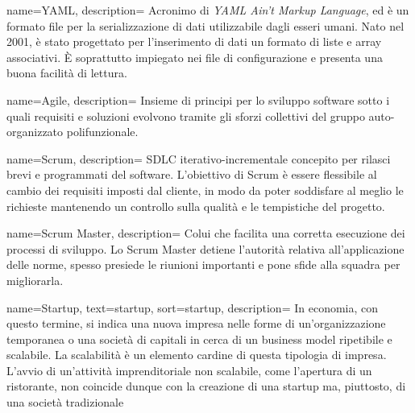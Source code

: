  {
  name=YAML,
  description={
Acronimo di \textit{YAML Ain't Markup Language}, ed è un formato file
per la serializzazione di dati utilizzabile dagli esseri umani. Nato nel 2001,
è stato progettato per l'inserimento di dati un formato di liste e array
associativi. È soprattutto impiegato nei file di configurazione e
presenta una buona facilità di lettura.
}
}

 {
  name=Agile,
  description={
Insieme di principi per lo sviluppo software sotto i quali requisiti e
soluzioni evolvono tramite gli sforzi collettivi del gruppo auto-organizzato
polifunzionale.
}
}

 {
  name=Scrum,
  description={
SDLC iterativo-incrementale concepito per rilasci brevi e programmati del
software. L'obiettivo di Scrum è essere flessibile al cambio dei requisiti
imposti dal cliente, in modo da poter soddisfare al meglio le richieste
mantenendo un controllo sulla qualità e le tempistiche del progetto.
}
}

 {
  name=Scrum Master,
  description={
Colui che facilita una corretta esecuzione dei processi di sviluppo. Lo Scrum
Master detiene l'autorità relativa all'applicazione delle norme, spesso
presiede le riunioni importanti e pone sfide alla squadra per migliorarla.
}
}

{
  name=Startup,
  text=startup,
  sort=startup,
  description={
In economia, con questo termine, si indica una nuova impresa
nelle forme di un'organizzazione temporanea o una società di capitali in cerca
di un business model ripetibile e scalabile.
La scalabilità è un elemento cardine di questa tipologia di impresa. L'avvio di
un'attività imprenditoriale non scalabile, come l'apertura di un ristorante,
non coincide dunque con la creazione di una startup ma, piuttosto, di una
società tradizionale
}
}


